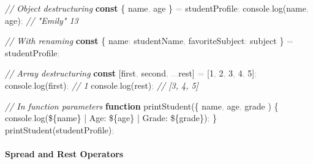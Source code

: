\documentclass[
  justified,
  openright,
]{tufte-book}
\let\subsection\paragraph
\let\paragraph\paragraph
\newcommand{\KeywordTok}[1]{\textcolor{CodeKeyword}{\textbf{#1}}}  %
\newcommand{\StringTok}[1]{\textcolor{CodeString}{#1}}              %
\newcommand{\CommentTok}[1]{\textcolor{CodeComment}{\textit{#1}}}  %
\newcommand{\CodeNumTok}[1]{\textcolor{CodeNumber}{#1}}             %
\newcommand{\CodeFuncTok}[1]{\textcolor{CodeKeyword}{#1}}           %
\newcommand{\CodeTypeTok}[1]{\textcolor{CodeType}{#1}}              %
\newcommand{\OperatorTok}[1]{\textcolor{DarkGray}{#1}}              %
\newenvironment{Shaded}{%
  \begin{mdframed}[style=TufteCode]%
}{%
  \end{mdframed}%
}
\let\subsection\paragraph
\let\paragraph\paragraph
\begin{document}
\begin{Shaded}
\begin{Highlighting}[]
\CommentTok{// Object destructuring}
\KeywordTok{const} \{ name\OperatorTok{,} age \} \OperatorTok{=} studentProfile\OperatorTok{;}
console\OperatorTok{.}\CodeFuncTok{log}(name\OperatorTok{,} age)\OperatorTok{;} \CommentTok{// "Emily" 13}
 
\CommentTok{// With renaming}
\KeywordTok{const} \{ \CodeTypeTok{name}\OperatorTok{:} studentName\OperatorTok{,} \CodeTypeTok{favoriteSubject}\OperatorTok{:} subject \} \OperatorTok{=} studentProfile\OperatorTok{;}
 
\CommentTok{// Array destructuring}
\KeywordTok{const} [first\OperatorTok{,} second\OperatorTok{,} \OperatorTok{...}rest] \OperatorTok{=} [\CodeNumTok{1}\OperatorTok{,} \CodeNumTok{2}\OperatorTok{,} \CodeNumTok{3}\OperatorTok{,} \CodeNumTok{4}\OperatorTok{,} \CodeNumTok{5}]\OperatorTok{;}
console\OperatorTok{.}\CodeFuncTok{log}(first)\OperatorTok{;} \CommentTok{// 1}
console\OperatorTok{.}\CodeFuncTok{log}(rest)\OperatorTok{;} \CommentTok{// [3, 4, 5]}
 
\CommentTok{// In function parameters}
\KeywordTok{function} \CodeFuncTok{printStudent}(\{ name\OperatorTok{,} age\OperatorTok{,} grade ) \{
  console\OperatorTok{.}\CodeFuncTok{log}(\StringTok{\textasciigrave{}}\StringTok{\$\{}name\StringTok{\}}\StringTok{ | Age: }\StringTok{\$\{}age\StringTok{\}}\StringTok{ | Grade: }\StringTok{\$\{}grade\StringTok{\}}\StringTok{\textasciigrave{}})\OperatorTok{;}
\}
\CodeFuncTok{printStudent}(studentProfile)\OperatorTok{;}
\end{Highlighting}
\end{Shaded}

\subsection{Spread and Rest
Operators}\label{spread-and-rest-operators}
\end{document}
